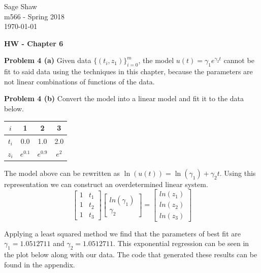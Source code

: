 \documentclass[12pt]{article}
\newcommand{\problem}[1]{\hspace{-4 ex} \large \textbf{Problem #1} }
\begin{document}
	\thispagestyle{empty}
	
	\begin{flushright}
		Sage Shaw \\
		m566 - Spring 2018 \\
		\today
	\end{flushright}
	
{\large \textbf{HW - Chapter 6}}\bigbreak

\problem{4 (a)} Given data $\{(t_i,z_1)\}_{i=0}^m$, the model $u(t) = \gamma_1 e^{\gamma_2 t}$ cannot be fit to said data using the techniques in this chapter, because the parameters are not linear combinations of functions of the data.

\bigbreak
\problem{4 (b)} Convert the model into a linear model and fit it to the data below.

\begin{center}
	\begin{tabular}{|c|c|c|c|}
		\hline
		$i$&1&2&3\\ \hline
		$t_i$&0.0&1.0&2.0\\ \hline
		$z_i$&$e^{0.1}$&$e^{0.9}$&$e^{2}$\\ \hline
	\end{tabular}
\end{center}

The model above can be rewritten as $\ln(u(t)) = \ln(\gamma_1) + \gamma_2 t$. Using this representation we can construct an overdetermined linear system.
$$
\begin{bmatrix}
1 & t_1\\
1 & t_2\\
1 & t_3
\end{bmatrix}
\begin{bmatrix}
ln(\gamma_1)\\
\gamma_2
\end{bmatrix}
=
\begin{bmatrix}
ln(z_1)\\
ln(z_2)\\
ln(z_3)
\end{bmatrix}
$$

Applying a least squared method we find that the parameters of best fit are $\gamma_1 = 1.0512711$ and $\gamma_2 = 1.0512711$. This exponential regression can be seen in the plot below along with our data. The code that generated these results can be found in the appendix.
\end{document}
